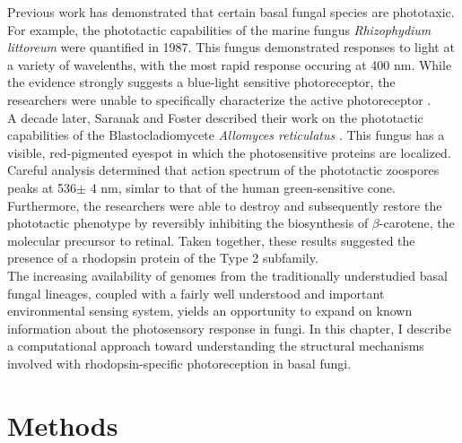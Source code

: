 \indent Previous work has demonstrated that certain basal fungal species are phototaxic. For example, the phototactic capabilities of the marine fungus \textit{Rhizophydium littoreum} were quantified in 1987. This fungus demonstrated responses to light at a variety of wavelenths, with the most rapid response occuring at 400 nm. While the evidence strongly suggests a blue-light sensitive photoreceptor, the researchers were unable to specifically characterize the active photoreceptor \cite{Muehlstein1987}.\\
\indent A decade later, Saranak and Foster described their work on the phototactic capabilities of the Blastocladiomycete \textit{Allomyces reticulatus} \cite{Saranak1997}. This fungus has a visible, red-pigmented eyespot in which the photosensitive proteins are localized. Careful analysis determined that action spectrum of the phototactic zoospores peaks at 536$\pm$ 4 nm, simlar to that of the human green-sensitive cone. Furthermore, the researchers were able to destroy and subsequently restore the phototactic phenotype by reversibly inhibiting the biosynthesis of $\beta$-carotene, the molecular precursor to retinal. Taken together, these results suggested the presence of a rhodopsin protein of the Type 2 subfamily.\\
\indent The increasing availability of genomes from the traditionally understudied basal fungal lineages, coupled with a fairly well understood and important environmental sensing system, yields an opportunity to expand on known information about the photosensory response in fungi. In this chapter, I describe a computational approach toward understanding the structural mechanisms involved with rhodopsin-specific photoreception in basal fungi.\\

\section{Methods}

